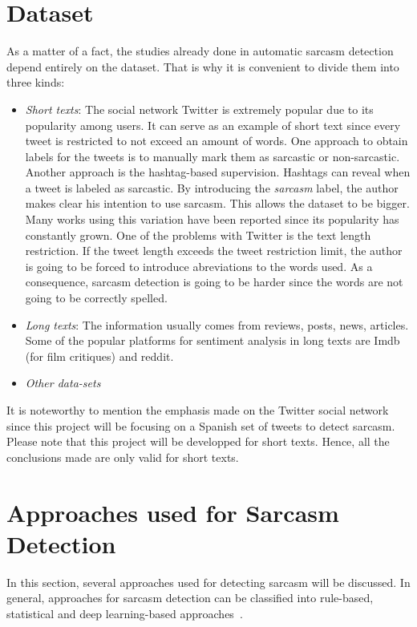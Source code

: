 \section{Dataset~\cite{joshi2017automatic}}

As a matter of a fact, the studies already done in automatic sarcasm detection depend entirely on the dataset. That is why it is convenient to divide them into three kinds:
\begin{itemize}
	\item \textit{Short texts}: The social network Twitter is extremely popular due to its popularity among users. It can serve as an example of short text since every tweet is restricted to not exceed an amount of words. One approach to obtain labels for the tweets is to manually mark them as sarcastic or non-sarcastic. Another approach is the hashtag-based supervision. Hashtags can reveal when a tweet is labeled as sarcastic. By introducing the \textit{sarcasm} label, the author makes clear his intention to use sarcasm.  This allows the dataset to be bigger. Many works using this variation have been reported since its popularity has constantly grown. One of the problems with Twitter is the text length restriction. If the tweet length exceeds the tweet restriction limit, the author is going to be forced to introduce abreviations to the words used. As a consequence, sarcasm detection is going to be harder since the words are not going to be correctly spelled.
	\item \textit{Long texts}: The information usually comes from reviews, posts, news, articles. Some of the popular platforms for sentiment analysis in long texts are Imdb (for film critiques) and reddit. 
	\item \textit{Other data-sets}
\end{itemize}

It is noteworthy to mention the emphasis made on the Twitter social network since this project will be focusing on a Spanish set of tweets to detect sarcasm. Please note that this project will be developped for short texts. Hence, all the conclusions made are only valid for short texts.

\section{Approaches used for Sarcasm Detection}
\label{sec:sarcasmapproach}
In this section, several approaches used for detecting sarcasm will be discussed. In general, approaches for sarcasm detection can be classified into rule-based, statistical and deep learning-based approaches~\cite{joshi2017automatic}.
